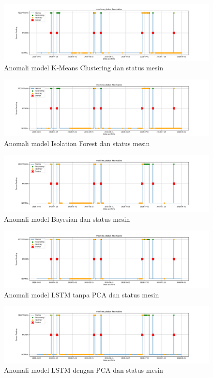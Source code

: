 \begin{figure}[h]
    \centerline{\includegraphics[width=1.4\textwidth]{resources/Acuan/KMeans_machine_status.png}}
    \caption{Anomali model K-Means Clustering dan status mesin} \label{KMms}
\end{figure}
\begin{figure}[h]
    \centerline{\includegraphics[width=1.4\textwidth]{resources/Acuan/IsoFor_machine_status.png}}
    \caption{Anomali model Isolation Forest dan status mesin} \label{IFms}
\end{figure}
\begin{figure}[h]
    \centerline{\includegraphics[width=1.4\textwidth]{resources/Bayes/Bayes_machine_status.png}}
    \caption{Anomali model Bayesian dan status mesin} \label{Bms}
\end{figure}
\begin{figure}[h]
    \centerline{\includegraphics[width=1.4\textwidth]{resources/LSTM/LSTM_noPCA_machine_status.png}}
    \caption{Anomali model LSTM tanpa PCA dan status mesin} \label{nPms}
\end{figure}
\begin{figure}[h]
    \centerline{\includegraphics[width=1.4\textwidth]{resources/LSTM/LSTM_PCA_machine_status.png}}
    \caption{Anomali model LSTM dengan PCA dan status mesin} \label{wPms}
\end{figure}